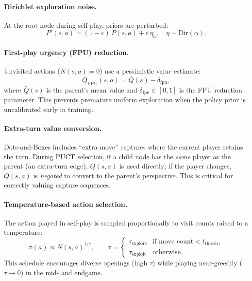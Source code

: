 \documentclass[11pt]{article}
\begin{document}
\paragraph{Dirichlet exploration noise.}
At the root node during self-play, priors are perturbed:
\begin{equation}
  P'(s,a) = (1-\varepsilon)\,P(s,a) + \varepsilon\,\eta_a,
  \quad \eta \sim \text{Dir}(\alpha).
\end{equation}

\paragraph{First-play urgency (FPU) reduction.}
Unvisited actions ($N(s,a)=0$) use a pessimistic value estimate:
\begin{equation}
  Q_{\text{FPU}}(s,a) = \bar{Q}(s) - \delta_{\text{fpu}},
\end{equation}
where $\bar{Q}(s)$ is the parent's mean value and
$\delta_{\text{fpu}} \in [0, 1]$ is the FPU reduction parameter. This
prevents premature uniform exploration when the policy prior is
uncalibrated early in training.

\paragraph{Extra-turn value conversion.}
Dots-and-Boxes includes ``extra move'' captures where the current player
retains the turn. During PUCT selection, if a child node has the
\emph{same} player as the parent (an extra-turn edge), $Q(s,a)$ is used
directly; if the player changes, $Q(s,a)$ is \emph{negated} to convert
to the parent's perspective. This is critical for correctly valuing
capture sequences.

\paragraph{Temperature-based action selection.}
The action played in self-play is sampled proportionally to visit counts
raised to a temperature:
\begin{equation}
  \pi(a) \propto N(s,a)^{1/\tau}, \qquad
  \tau = \begin{cases}
    \tau_{\text{explore}} & \text{if move count} < t_{\text{thresh}}, \\
    \tau_{\text{exploit}} & \text{otherwise}.
  \end{cases}
\end{equation}
This schedule encourages diverse openings (high $\tau$) while playing
near-greedily ($\tau \to 0$) in the mid- and endgame.
\end{document}
